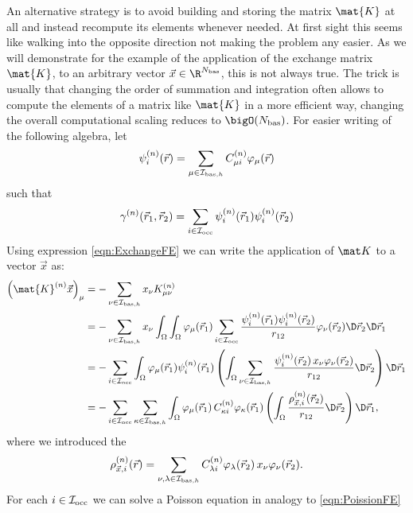 An alternative strategy
is to avoid building and storing the matrix $\mat{K}$ at all
and instead recompute its elements whenever needed.
At first sight this seems like walking into the opposite direction
not making the problem any easier.
As we will demonstrate for the example
of the application of the exchange matrix $\mat{K}$,
to an arbitrary vector $\vec{x} \in \R^{\Nbas}$,
this is not always true.
The trick is usually that changing the order of summation and integration
often allows to compute the elements of a matrix like $\mat{K}$
in a more efficient way,
changing the overall computational scaling reduces to $\bigO(\Nbas)$.
For easier writing of the following algebra, let
\[ \psi_i^{(n)}(\vec{r}) = \sum_{\mu\in\mathcal{I}_{\text{bas},h}} C^{(n)}_{\mu i} \varphi_\mu(\vec{r}) \]
such that
\[
	\gamma^{(n)}(\vec{r}_1, \vec{r}_2)
	= \sum_{i\in\mathcal{I}_\text{occ}} \psi_i^{(n)}(\vec{r}_1) \psi_i^{(n)}(\vec{r}_2)
\]
Using expression \eqref{eqn:ExchangeFE} we can write
the application of $\matK$ to a vector $\vec{x}$ as:
\begin{equation}
\label{eqn:ExchangeApply}
\begin{aligned}
	\left( \mat{K}^{(n)} \vec{x}  \right)_\mu
	&= -\sum_{\nu\in\Ibash} x_\nu K^{(n)}_{\mu\nu} \\
	&= -\sum_{\nu\in\Ibash}
		x_\nu
		\int_\Omega \int_\Omega
		\varphi_\mu(\vec{r}_1)
		\sum_{i\in\Iocc}
		\frac{
			\psi_i^{(n)}(\vec{r}_1) \psi_i^{(n)}(\vec{r}_2)
		}{r_{12}}
		\varphi_\nu(\vec{r}_2) \D \vec{r}_2 \D \vec{r}_1 \\
	&= -\sum_{i\in\Iocc}
		\int_\Omega
		\varphi_\mu(\vec{r}_1) \psi_i^{(n)}(\vec{r}_1)
		\left(
		\int_\Omega
		\sum_{\nu\in\Ibash}
			\frac{\psi_i^{(n)}(\vec{r}_2) \, x_\nu \varphi_\nu(\vec{r}_2)}
			{r_{12}}
		\D \vec{r}_2
		\right) \D \vec{r}_1 \\
	&= -\sum_{i\in\Iocc} \sum_{\kappa\in\Ibash}
		\int_\Omega
			\varphi_\mu(\vec{r}_1) \, C^{(n)}_{\kappa i} \varphi_\kappa(\vec{r}_1)
		\left(
		\int_\Omega \frac{\rho_{\vec{x},i}^{(n)}(\vec{r}_2)}{r_{12}} \D \vec{r}_2
		\right) \D \vec{r}_1,
\end{aligned}
\end{equation}
where we introduced the 
\begin{equation}
	\label{eqn:ExchangeContrDens}
	\rho_{\vec{x},i}^{(n)}(\vec{r}) = \sum_{\nu,\lambda\in\mathcal{I}_{\text{bas},h}}
	C^{(n)}_{\lambda i} \varphi_\lambda(\vec{r}_2) \, x_\nu \varphi_\nu(\vec{r}_2).
\end{equation}
For each $i\in\mathcal{I}_\text{occ}$ we can solve a Poisson equation in analogy to \eqref{eqn:PoissionFE}
